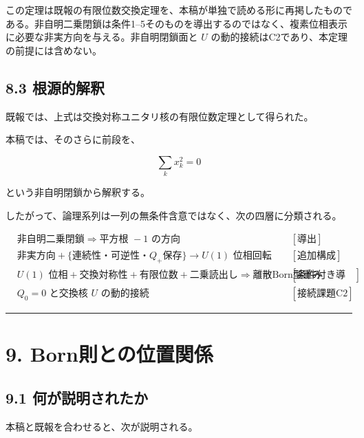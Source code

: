 \documentclass[
  a4paper,
  10pt]{article}
\begin{document}
この定理は既報の有限位数交換定理を、本稿が単独で読める形に再掲したものである。非自明二乗閉鎖は条件1--5そのものを導出するのではなく、複素位相表示に必要な非実方向を与える。非自明閉鎖面と
\(U\) の動的接続はC2であり、本定理の前提には含めない。

\subsection{8.3 根源的解釈}\label{83-ux6839ux6e90ux7684ux89e3ux91c8}

既報では、上式は交換対称ユニタリ核の有限位数定理として得られた。

本稿では、そのさらに前段を、

\[
\boxed{
\sum_kx_k^2=0
}
\]

という非自明閉鎖から解釈する。

したがって、論理系列は一列の無条件含意ではなく、次の四層に分類される。

\[
\boxed{
\begin{aligned}
&\text{非自明二乗閉鎖}
\Rightarrow
\text{平方根 }-1\text{ の方向}
&&[\text{導出}]\\
&\text{非実方向}
+
\{\text{連続性・可逆性・}Q_+\text{保存}\}
\longrightarrow
U(1)\text{ 位相回転}
&&[\text{追加構成}]\\
&U(1)\text{ 位相}
+
\text{交換対称性}
+
\text{有限位数}
+
\text{二乗読出し}
\Rightarrow
\text{離散Born型重み}
&&[\text{条件付き導出}]\\
&Q_0=0\text{ と交換核 }U\text{ の動的接続}
&&[\text{接続課題C2}]
\end{aligned}
}
\]

\begin{center}\rule{0.5\linewidth}{0.5pt}\end{center}

\section{9.
Born則との位置関係}\label{9-bornux5247ux3068ux306eux4f4dux7f6eux95a2ux4fc2}

\subsection{9.1
何が説明されたか}\label{91-ux4f55ux304cux8aacux660eux3055ux308cux305fux304b}

本稿と既報を合わせると、次が説明される。
\end{document}
